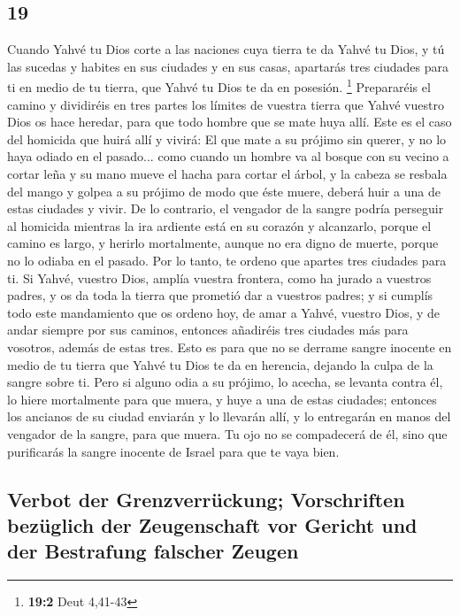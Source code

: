\begin{paracol}{2}
\hypertarget{section-36}{%
\section{19}\label{section-36}}

 Cuando Yahvé tu Dios corte a las naciones cuya tierra te
da Yahvé tu Dios, y tú las sucedas y habites en sus ciudades y en sus
casas,  apartarás tres ciudades para ti en medio de tu
tierra, que Yahvé tu Dios te da en posesión. \footnote{\textbf{19:2}
  Deut 4,41-43}  Prepararéis el camino y dividiréis en
tres partes los límites de vuestra tierra que Yahvé vuestro Dios os hace
heredar, para que todo hombre que se mate huya allí.  Este
es el caso del homicida que huirá allí y vivirá: El que mate a su
prójimo sin querer, y no lo haya odiado en el pasado... 
como cuando un hombre va al bosque con su vecino a cortar leña y su mano
mueve el hacha para cortar el árbol, y la cabeza se resbala del mango y
golpea a su prójimo de modo que éste muere, deberá huir a una de estas
ciudades y vivir.  De lo contrario, el vengador de la
sangre podría perseguir al homicida mientras la ira ardiente está en su
corazón y alcanzarlo, porque el camino es largo, y herirlo mortalmente,
aunque no era digno de muerte, porque no lo odiaba en el pasado.
 Por lo tanto, te ordeno que apartes tres ciudades para
ti.  Si Yahvé, vuestro Dios, amplía vuestra frontera, como
ha jurado a vuestros padres, y os da toda la tierra que prometió dar a
vuestros padres;  y si cumplís todo este mandamiento que
os ordeno hoy, de amar a Yahvé, vuestro Dios, y de andar siempre por sus
caminos, entonces añadiréis tres ciudades más para vosotros, además de
estas tres.  Esto es para que no se derrame sangre
inocente en medio de tu tierra que Yahvé tu Dios te da en herencia,
dejando la culpa de la sangre sobre ti.  Pero si alguno
odia a su prójimo, lo acecha, se levanta contra él, lo hiere mortalmente
para que muera, y huye a una de estas ciudades;  entonces
los ancianos de su ciudad enviarán y lo llevarán allí, y lo entregarán
en manos del vengador de la sangre, para que muera.  Tu
ojo no se compadecerá de él, sino que purificarás la sangre inocente de
Israel para que te vaya bien.

\hypertarget{verbot-der-grenzverruxfcckung-vorschriften-bezuxfcglich-der-zeugenschaft-vor-gericht-und-der-bestrafung-falscher-zeugen}{%
\subsection{Verbot der Grenzverrückung; Vorschriften bezüglich der
Zeugenschaft vor Gericht und der Bestrafung falscher
Zeugen}\label{verbot-der-grenzverruxfcckung-vorschriften-bezuxfcglich-der-zeugenschaft-vor-gericht-und-der-bestrafung-falscher-zeugen}}


\end{paracol}

